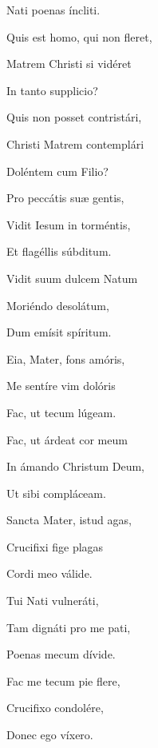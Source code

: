 \documentclass[12pt,a6paper]{book}
\begin{document}
\begin{sloppy}
Nati poenas íncliti.

\vspace{3mm}

Quis est homo, qui non fleret,

Matrem Christi si vidéret

In tanto supplicio?

\vspace{3mm}

Quis non posset contristári,

Christi Matrem contemplári

Doléntem cum Filio?

\vspace{3mm}

Pro peccátis suæ gentis,

Vidit Iesum in torméntis,

Et flagéllis súbditum.

\vspace{3mm}

Vidit suum dulcem Natum

Moriéndo desolátum,

Dum emísit spíritum.

\vspace{3mm}

Eia, Mater, fons amóris,

Me sentíre vim dolóris

Fac, ut tecum lúgeam.

\vspace{3mm}

Fac, ut árdeat cor meum

In ámando Christum Deum,

Ut sibi compláceam.

\vspace{3mm}

Sancta Mater, istud agas,

Crucifixi fige plagas

Cordi meo válide.

\vspace{3mm}

Tui Nati vulneráti,

Tam dignáti pro me pati,

Poenas mecum dívide.

\vspace{3mm}

Fac me tecum pie flere,

Crucifixo condolére,

Donec ego víxero.


\end{sloppy}
\end{document}

